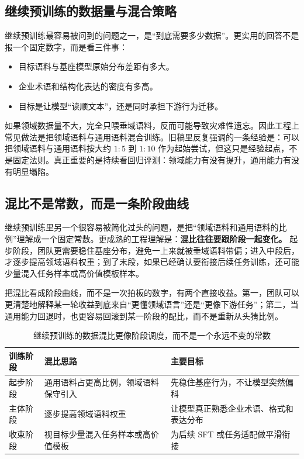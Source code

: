 \subsection{继续预训练的数据量与混合策略}
继续预训练最容易被问到的问题之一，是“到底需要多少数据”。更实用的回答不是报一个固定数字，而是看三件事：
\begin{itemize}
  \item 目标语料与基座模型原始分布差距有多大。
  \item 企业术语和结构化表达的密度有多高。
  \item 目标是让模型“读顺文本”，还是同时承担下游行为迁移。
\end{itemize}

如果领域数据量不大，完全只喂垂域语料，反而可能导致灾难性遗忘。因此工程上常见做法是把领域语料与通用语料混合训练。旧稿里反复强调的一条经验是：可以把领域语料与通用语料按大约 \(1:5\) 到 \(1:10\) 作为起始尝试，但这只是经验起点，不是固定法则。真正重要的是持续看回归评测：领域能力有没有提升，通用能力有没有明显塌陷。

\subsection{混比不是常数，而是一条阶段曲线}
继续预训练里另一个很容易被简化过头的问题，是把“领域语料和通用语料的比例”理解成一个固定常数。更成熟的工程理解是：\textbf{混比往往要跟阶段一起变化。} 起步阶段，团队更需要稳住基座分布，避免一上来就被垂域语料带偏；进入中段后，才逐步提高领域语料权重；到了末段，如果已经确认要衔接后续任务训练，还可能少量混入任务样本或高价值模板样本。

把混比看成阶段曲线，而不是一次拍板的数字，有两个直接收益。第一，团队可以更清楚地解释某一轮收益到底来自“更懂领域语言”还是“更像下游任务”；第二，当通用能力回退时，也更容易回滚到某一阶段的配比，而不是重新从头猜比例。

\begin{table}[H]
\centering
\small
\begin{tabularx}{\textwidth}{>{\raggedright\arraybackslash}p{2.8cm}>{\raggedright\arraybackslash}p{3.1cm}>{\raggedright\arraybackslash}X}
\toprule
\textbf{训练阶段} & \textbf{混比思路} & \textbf{主要目标} \\
\midrule
起步阶段 & 通用语料占更高比例，领域语料保守引入 & 先稳住基座行为，不让模型突然偏科 \\
主体阶段 & 逐步提高领域语料权重 & 让模型真正熟悉企业术语、格式和表达分布 \\
收束阶段 & 视目标少量混入任务样本或高价值模板 & 为后续 SFT 或任务适配做平滑衔接 \\
\bottomrule
\end{tabularx}
\caption{继续预训练的数据混比更像阶段调度，而不是一个永远不变的常数}
\label{tab:data-mixture-schedule}
\end{table}

